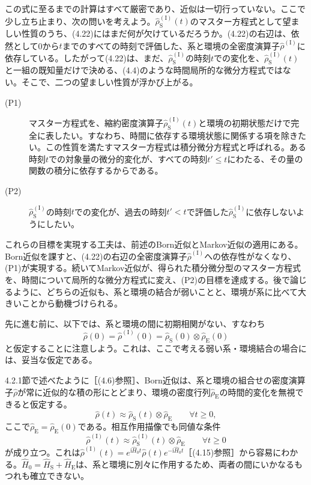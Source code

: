 この式に至るまでの計算はすべて厳密であり、近似は一切行っていない。ここで少し立ち止まり、次の問いを考えよう。$\hat\rho^{(\mathrm I)}_{\mathrm S}(t)$のマスター方程式として望ましい性質のうち、(4.22)にはまだ何が欠けているだろうか。(4.22)の右辺は、依然として0から$t$までのすべての時刻で評価した、系と環境の全密度演算子$\hat\rho^{(\mathrm I)}$に依存している。したがって(4.22)は、まだ、$\hat\rho^{(\mathrm I)}_{\mathrm S}$の時刻$t$での変化を、$\hat\rho^{(\mathrm I)}_{\mathrm S}(t)$と一組の既知量だけで決める、(4.4)のような時間局所的な微分方程式ではない。そこで、二つの望ましい性質が浮かび上がる。

\hypertarget{srcpage:160}{}\label{srcpage:160}
\begin{description}
\item[(P1)] マスター方程式を、縮約密度演算子$\hat\rho^{(\mathrm I)}_{\mathrm S}(t)$と環境の初期状態だけで完全に表したい。すなわち、時間に依存する環境状態に関係する項を除きたい。この性質を満たすマスター方程式は積分微分方程式と呼ばれる。ある時刻$t$での対象量の微分的変化が、すべての時刻$t'\leq t$にわたる、その量の関数の積分に依存するからである。
\item[(P2)] $\hat\rho^{(\mathrm I)}_{\mathrm S}$の時刻$t$での変化が、過去の時刻$t'<t$で評価した$\hat\rho^{(\mathrm I)}_{\mathrm S}$に依存しないようにしたい。
\end{description}
これらの目標を実現する工夫は、前述のBorn近似とMarkov近似の適用にある。Born近似を課すと、(4.22)の右辺の全密度演算子$\hat\rho^{(\mathrm I)}$への依存性がなくなり、(P1)が実現する。続いてMarkov近似が、得られた積分微分型のマスター方程式を、時間について局所的な微分方程式に変え、(P2)の目標を達成する。後で論じるように、どちらの近似も、系と環境の結合が弱いことと、環境が系に比べて大きいことから動機づけられる。

先に進む前に、以下では、系と環境の間に初期相関がない、すなわち
\begin{equation}
\hat\rho(0)=\hat\rho^{(\mathrm I)}(0)=\hat\rho_{\mathrm S}(0)\otimes\hat\rho_{\mathrm E}(0)
\tag{4.23}
\end{equation}
と仮定することに注意しよう。これは、ここで考える弱い系・環境結合の場合には、妥当な仮定である。

4.2.1節で述べたように［(4.6)参照］、Born近似は、系と環境の組合せの密度演算子$\hat\rho$が常に近似的な積の形にとどまり、環境の密度行列$\hat\rho_{\mathrm E}$の時間的変化を無視できると仮定する。
\begin{equation}
\hat\rho(t)\approx\hat\rho_{\mathrm S}(t)\otimes\hat\rho_{\mathrm E}\qquad\forall t\geq0,
\tag{4.24}
\end{equation}
ここで$\hat\rho_{\mathrm E}=\hat\rho_{\mathrm E}(0)$である。相互作用描像でも同値な条件
\begin{equation}
\hat\rho^{(\mathrm I)}(t)\approx\hat\rho^{(\mathrm I)}_{\mathrm S}(t)\otimes\hat\rho_{\mathrm E}\qquad\forall t\geq0
\tag{4.25}
\end{equation}
が成り立つ。これは$\hat\rho^{(\mathrm I)}(t)=e^{\mathrm i\hat H_0t}\hat\rho(t)e^{-\mathrm i\hat H_0t}$［(4.15)参照］から容易にわかる。$\hat H_0=\hat H_{\mathrm S}+\hat H_{\mathrm E}$は、系と環境に別々に作用するため、両者の間にいかなるもつれも確立できない。

